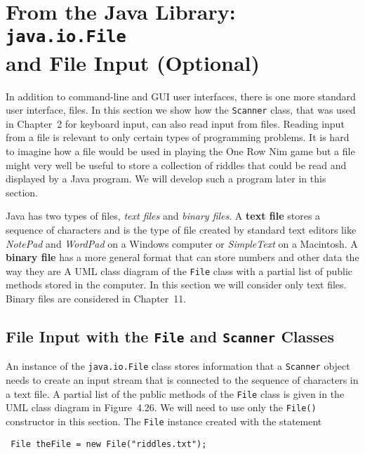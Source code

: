 \section{From the Java Library: {\tt java.io.File} \\ and File Input (Optional)}

\label{pg-sec-fileclass}

In addition to command-line and GUI user interfaces, there is one more
standard user interface, files. In this section we show how the {\tt Scanner} 
class, that was used in Chapter~2 for keyboard input, can also 
read input from files.  Reading input from
a file is relevant to only certain types of programming problems.  
It is hard to imagine how a file would be used in playing the One Row Nim 
game but a file might very well be useful to store a collection of riddles
that could be read and displayed by a Java program.  We will develop such a 
program later in this section.

Java has two types of files, {\it text files} and {\it binary files}.  
A {\bf text file} stores a sequence of characters and is the type of
file created by standard text editors like {\it NotePad} and {\it WordPad}
on a Windows computer or {\it SimpleText} on a Macintosh. A {\bf binary file}
has a more general format that can store numbers and other data the way they are
 {A UML class diagram of the {\tt File}
 class with a partial list of public methods 
 \label{fig-fileuml}}
stored in the computer.  In this section we will consider only text files. Binary
files are considered in Chapter~11.


\subsection{File Input with the {\tt File} and {\tt Scanner} Classes} 

An instance of the {\tt java.io.File} class stores information that
a {\tt Scanner} object needs to create an input stream that is connected
to the sequence of characters in a text file. A partial list of the
public methods of the {\tt File} class is given in the UML class diagram 
in Figure~4.26.  We will need to use only the {\tt File()}
constructor in this section.  The {\tt File} instance created with the 
statement

\begin{jjjlisting}
\begin{lstlisting}
 File theFile = new File("riddles.txt");
\end{lstlisting}
\end{jjjlisting}

